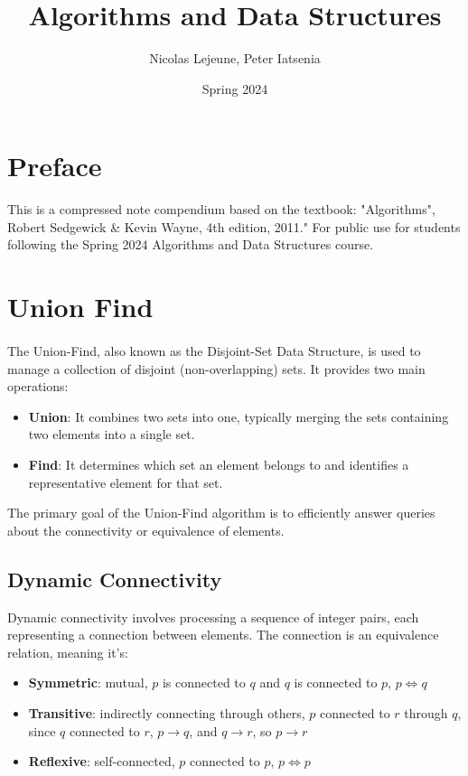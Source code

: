 \documentclass{article}
\title{Algorithms and Data Structures}
\author{Nicolas Lejeune, Peter Iatsenia }
\date{Spring 2024}
\begin{document}
\maketitle

\tableofcontents

\pagebreak

\section*{Preface}
This is a compressed note compendium based on the textbook: "Algorithms", Robert Sedgewick \& Kevin Wayne, 4th edition, 2011." For public use for students following the Spring 2024 Algorithms and Data Structures course.

\section{Union Find}
\paragraph{}
The Union-Find, also known as the Disjoint-Set Data Structure, is used to manage a collection of disjoint (non-overlapping) sets. It provides two main operations:

\begin{itemize}
    \item \textbf{Union}: It combines two sets into one, typically merging the sets containing two elements into a single set.
    \item \textbf{Find}: It determines which set an element belongs to and identifies a representative element for that set.
\end{itemize}

The primary goal of the Union-Find algorithm is to efficiently answer queries about the connectivity or equivalence of elements. 

\subsection{Dynamic Connectivity}
Dynamic connectivity involves processing a sequence of integer pairs, each representing a connection between elements. The connection is an equivalence relation, meaning it's: 

\begin{itemize}
    \item \textbf{Symmetric}: mutual, $p$ is connected to $q$ and $q$ is connected to $p$, \hfill \break 
    $p \iff q$
    \item \textbf{Transitive}: indirectly connecting through others, $p$ connected to $r$ through $q$, since $q$ connected to $r$, \hfill \break 
    $p \to q$, and $q \to r$, so $p \to r$
    \item \textbf{Reflexive}: self-connected, $p$ connected to $p$, \hfill \break 
    $p \iff p$
\end{itemize}
\end{document}
